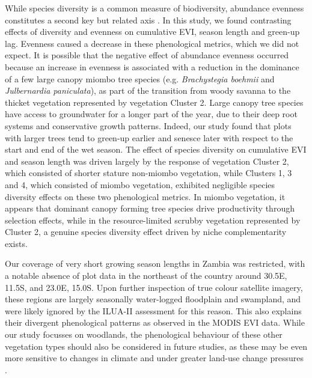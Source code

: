 \documentclass[11pt,a4paper]{article}
\begin{document}
While species diversity is a common measure of biodiversity, abundance evenness constitutes a second key but related axis \citep{Wilsey2005, Hillebrand2008, Jost2010}. In this study, we found contrasting effects of diversity and evenness on cumulative EVI, season length and green-up lag. Evenness caused a decrease in these phenological metrics, which we did not expect. It is possible that the negative effect of abundance evenness occurred because an increase in evenness is associated with a reduction in the dominance of a few large canopy miombo tree species (e.g. \textit{Brachystegia boehmii} and \textit{Julbernardia paniculata}), as part of the transition from woody savanna to the thicket vegetation represented by vegetation Cluster 2. Large canopy tree species have access to groundwater for a longer part of the year, due to their deep root systems and conservative growth patterns. Indeed, our study found that plots with larger trees tend to green-up earlier and senesce later with respect to the start and end of the wet season. The effect of species diversity on cumulative EVI and season length was driven largely by the response of vegetation Cluster 2, which consisted of shorter stature non-miombo vegetation, while Clusters 1, 3 and 4, which consisted of miombo vegetation, exhibited negligible species diversity effects on these two phenological metrics. In miombo vegetation, it appears that dominant canopy forming tree species drive productivity through selection effects, while in the resource-limited scrubby vegetation represented by Cluster 2, a genuine species diversity effect driven by niche complementarity exists. 

Our coverage of very short growing season lengths in Zambia was restricted, with a notable absence of plot data in the northeast of the country around 30.5\textdegree{}E, 11.5\textdegree{}S, and 23.0\textdegree{}E, 15.0\textdegree{}S. Upon further inspection of true colour satellite imagery, these regions are largely seasonally water-logged floodplain and swampland, and were likely ignored by the ILUA-II assessment for this reason. This also explains their divergent phenological patterns as observed in the MODIS EVI data. While our study focusses on woodlands, the phenological behaviour of these other vegetation types should also be considered in future studies, as these may be even more sensitive to changes in climate \citep{Dean2018} and under greater land-use change pressures \citep{Langan2018}.
\end{document}
